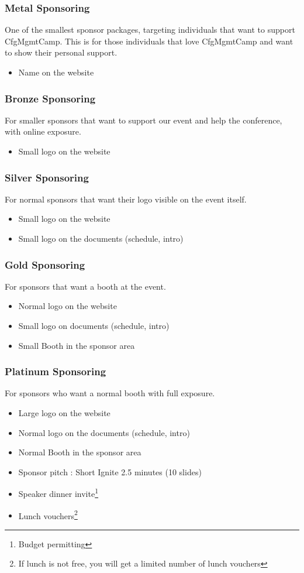 \begin{frame}
\frametitle{Metal Sponsoring}
One of the smallest sponsor packages, targeting individuals that want to support CfgMgmtCamp.
This is for those individuals that love CfgMgmtCamp and want to show their personal support.
\begin{itemize}
	\item<+->
	Name on the website
\end{itemize}
\end{frame}

\begin{frame}
\frametitle{Bronze Sponsoring}
For smaller sponsors that want to support our event and help the conference, with online exposure.
\begin{itemize}
	\item<+->
	Small logo on the website
	\end{itemize}
\end{frame}

\begin{frame}
\frametitle{Silver Sponsoring}
For normal sponsors that want their logo visible on the event itself.
\begin{itemize}
	\item<+->
	Small logo on the website
	\item<+->
	Small logo on the documents (schedule, intro)
\end{itemize}
\end{frame}

\begin{frame}
\frametitle{Gold Sponsoring}
For sponsors that want a booth at the event.
\begin{itemize}
	\item<+->
	Normal logo on the website
	\item<+->
	Small logo on documents (schedule, intro)
	\item<+->
	Small Booth in the sponsor area
\end{itemize}
\end{frame}

\begin{frame}
\frametitle{Platinum Sponsoring}
For sponsors who want a normal booth with full exposure.
\begin{itemize}
	\item<+->
	Large logo on the website
	\item<+->
	Normal logo on the documents (schedule, intro)
	\item<+->
	Normal Booth in the sponsor area
	\item<+->
	Sponsor pitch : Short Ignite 2.5 minutes (10 slides)
	\item<+->
	Speaker dinner invite\footnote{Budget permitting}
	\item<+->
	Lunch vouchers\footnote{If lunch is not free, you will get a limited number of lunch vouchers}
\end{itemize}
\end{frame}

